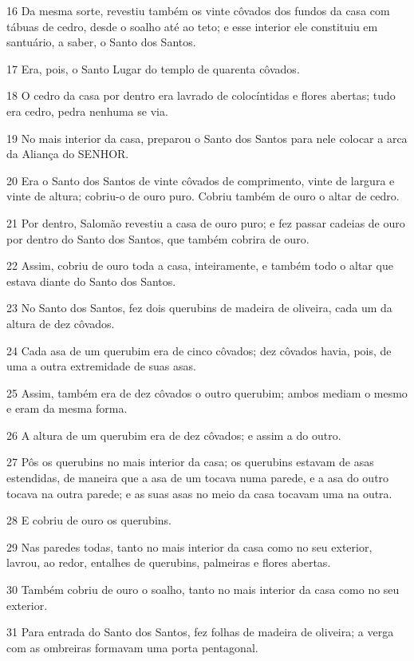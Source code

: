 \par 16 Da mesma sorte, revestiu também os vinte côvados dos fundos da casa com tábuas de cedro, desde o soalho até ao teto; e esse interior ele constituiu em santuário, a saber, o Santo dos Santos.
\par 17 Era, pois, o Santo Lugar do templo de quarenta côvados.
\par 18 O cedro da casa por dentro era lavrado de colocíntidas e flores abertas; tudo era cedro, pedra nenhuma se via.
\par 19 No mais interior da casa, preparou o Santo dos Santos para nele colocar a arca da Aliança do SENHOR.
\par 20 Era o Santo dos Santos de vinte côvados de comprimento, vinte de largura e vinte de altura; cobriu-o de ouro puro. Cobriu também de ouro o altar de cedro.
\par 21 Por dentro, Salomão revestiu a casa de ouro puro; e fez passar cadeias de ouro por dentro do Santo dos Santos, que também cobrira de ouro.
\par 22 Assim, cobriu de ouro toda a casa, inteiramente, e também todo o altar que estava diante do Santo dos Santos.
\par 23 No Santo dos Santos, fez dois querubins de madeira de oliveira, cada um da altura de dez côvados.
\par 24 Cada asa de um querubim era de cinco côvados; dez côvados havia, pois, de uma a outra extremidade de suas asas.
\par 25 Assim, também era de dez côvados o outro querubim; ambos mediam o mesmo e eram da mesma forma.
\par 26 A altura de um querubim era de dez côvados; e assim a do outro.
\par 27 Pôs os querubins no mais interior da casa; os querubins estavam de asas estendidas, de maneira que a asa de um tocava numa parede, e a asa do outro tocava na outra parede; e as suas asas no meio da casa tocavam uma na outra.
\par 28 E cobriu de ouro os querubins.
\par 29 Nas paredes todas, tanto no mais interior da casa como no seu exterior, lavrou, ao redor, entalhes de querubins, palmeiras e flores abertas.
\par 30 Também cobriu de ouro o soalho, tanto no mais interior da casa como no seu exterior.
\par 31 Para entrada do Santo dos Santos, fez folhas de madeira de oliveira; a verga com as ombreiras formavam uma porta pentagonal.
